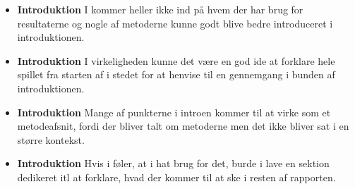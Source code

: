 \documentclass[11pt, fleqn, titlepage]{article}
\begin{document}
\begin{itemize}
		\item \textbf{Introduktion} I kommer heller ikke ind på hvem der har brug for resultaterne og nogle af metoderne kunne godt blive bedre introduceret i introduktionen.
		
		\item \textbf{Introduktion} I virkeligheden kunne det være en god ide at forklare hele spillet fra starten af i stedet for at henvise til en gennemgang i bunden af introduktionen.
		
		\item \textbf{Introduktion} Mange af punkterne i introen kommer til at virke som et metodeafsnit, fordi der bliver talt om metoderne men det ikke bliver sat i en større kontekst.
		
		\item \textbf{Introduktion} Hvis i føler, at i hat brug for det, burde i lave en sektion dedikeret itl at forklare, hvad der kommer til at ske i resten af rapporten.
		
		
		
		
		
	\end{itemize}
	
	
\end{document}
